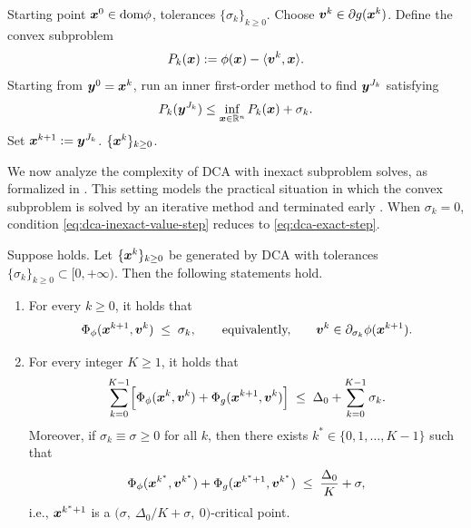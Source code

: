 \begin{algorithm}[tbp]
    \caption{\textbf{Inexact DCA}}
    \label{alg:inexact-dca-inner}
    \begin{algorithmic}[1]
         Starting point $\bm{x}^0\in\mathrm{dom}\phi$,
        tolerances $\{\sigma_k\}_{k\ge0}$.
            \STATE Choose $\bm{v}^k\in\partial g(\bm{x}^k)$.
            \STATE Define the convex subproblem
            \[
                P_k(\bm{x}):=\phi(\bm{x})-\langle\bm{v}^k,\bm{x}\rangle .
            \]
            \STATE Starting from $\bm{y}^0=\bm{x}^k$, run an inner first-order
            method to find $\bm{y}^{J_k}$ satisfying
            \begin{equation}
                P_k(\bm{y}^{J_k})
                \le
                \inf_{\bm{x}\in\mathbb{R}^n}P_k(\bm{x})+\sigma_k .
                \label{eq:dca-inexact-value-step}
            \end{equation}
            \STATE Set $\bm{x}^{k+1}:=\bm{y}^{J_k}$.
        \ENDFOR
         $\{\bm{x}^k\}_{k\ge0}$.
    \end{algorithmic}
\end{algorithm}

We now analyze the complexity of DCA with inexact subproblem solves, as
formalized in . This setting models the
practical situation in which the convex subproblem is solved by an
iterative method and terminated early \citep{yao2022large}. When
$\sigma_k=0$, condition \eqref{eq:dca-inexact-value-step} reduces to
\eqref{eq:dca-exact-step}.

\begin{lemma}
\label{lem:dca-inexact-complexity}
Suppose  holds. Let
$\{\bm{x}^k\}_{k\ge0}$ be generated by DCA with tolerances
$\{\sigma_k\}_{k\ge0}\subset[0,+\infty)$. Then the following statements
hold.
\begin{enumerate}
    \item[(i)] For every $k\ge0$, it holds that
    \[
        \Phi_\phi(\bm{x}^{k+1},\bm{v}^k)\;\le\;\sigma_k,
        \qquad\text{equivalently,}\qquad
        \bm{v}^k\in\partial_{\sigma_k}\phi(\bm{x}^{k+1}).
    \]
    \item[(ii)] For every integer $K\ge1$, it holds that
    \begin{equation}
        \sum_{k=0}^{K-1}
        \Bigl[
            \Phi_\phi(\bm{x}^k,\bm{v}^k)
            +\Phi_g(\bm{x}^{k+1},\bm{v}^k)
        \Bigr]
        \;\le\;
        \Delta_0+\sum_{k=0}^{K-1}\sigma_k .
        \label{eq:dca-inexact-telescope}
    \end{equation} Moreover, if  $\sigma_k\equiv\sigma\ge0$ for all $k$, then there exists $k^*\in\{0,1,\ldots,K-1\}$ such that
    \begin{equation}
        \Phi_\phi(\bm{x}^{k^*},\bm{v}^{k^*})
        +\Phi_g(\bm{x}^{k^*+1},\bm{v}^{k^*})
        \;\le\;
        \frac{\Delta_0}{K}+\sigma,
        \label{eq:dca-inexact-best-index}
    \end{equation} i.e.,  $\bm{x}^{k^*+1}$ is a
        $\bigl(\sigma,\ \Delta_0/K+\sigma,\ 0\bigr)$-critical point.
\end{enumerate}
\end{lemma}

